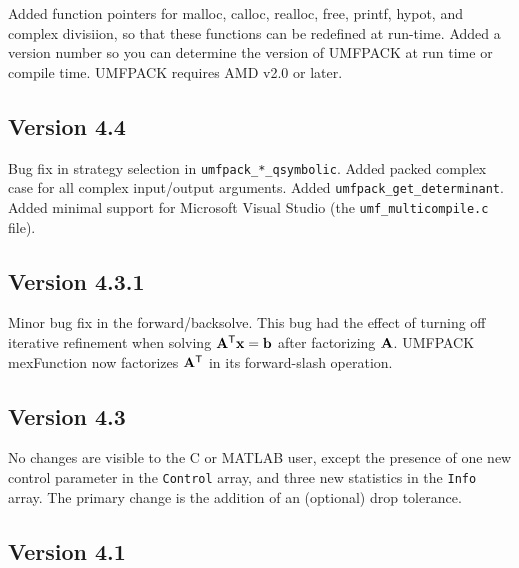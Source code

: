 \documentclass[11pt]{article}
\newcommand{\m}[1]{{\bf{#1}}}       %
\newcommand{\tr}{^{\sf T}}          %
\begin{document}
Added function pointers for malloc, calloc, realloc, free, printf, hypot,
and complex divisiion, so that these functions can be redefined at run-time.
Added a version number so you can determine the
version of UMFPACK at run time or compile time.  UMFPACK requires AMD v2.0
or later.

\subsection{Version 4.4}

Bug fix in strategy selection in {\tt umfpack\_*\_qsymbolic}.
Added packed complex case for all complex input/output arguments.
Added {\tt umfpack\_get\_determinant}.
Added minimal support for Microsoft Visual Studio
(the {\tt umf\_multicompile.c} file).

\subsection{Version 4.3.1}

Minor bug fix in the forward/backsolve.  This bug had the effect of turning
off iterative refinement when solving $\m{A}\tr\m{x}=\m{b}$ after factorizing
$\m{A}$.  UMFPACK mexFunction now factorizes $\m{A}\tr$ in its forward-slash
operation.

\subsection{Version 4.3}

No changes are visible to the C or MATLAB user, except the presence of
one new control parameter in the {\tt Control} array,
and three new statistics in the {\tt Info} array.
The primary change is the addition of an (optional) drop tolerance.

\subsection{Version 4.1}
\end{document}
